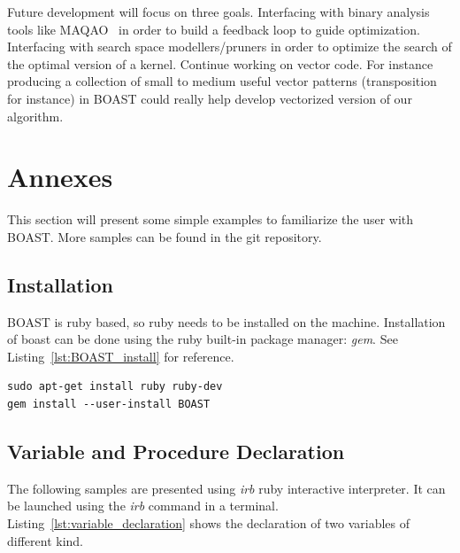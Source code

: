\documentclass[11pt, a4paper, twoside]{montblanc}
\begin{document}
Future development will focus on three goals. Interfacing with binary analysis
tools like MAQAO~\cite{djoudi2005exploring} in order to build a feedback loop to
guide optimization. Interfacing with search space modellers/pruners in order to
optimize the search of the optimal version of a kernel. Continue working on
vector code. For instance producing a collection of small to medium useful
vector patterns (transposition for instance) in BOAST could really help develop
vectorized version of our algorithm.






\section*{Annexes}

This section will present some simple examples to familiarize the user with
BOAST. More samples can be found in the git repository.

\subsection*{Installation}

BOAST is ruby based, so ruby needs to be installed on the machine.
Installation of boast can be done using the ruby built-in package manager:
\textit{gem}. See Listing~\ref{lst:BOAST_install} for reference.

\begin{lstlisting}
sudo apt-get install ruby ruby-dev
gem install --user-install BOAST
\end{lstlisting}

\subsection*{Variable and Procedure Declaration}

The following samples are presented using \textit{irb} ruby interactive
interpreter. It can be launched using the \textit{irb} command in a terminal.
Listing~\ref{lst:variable_declaration} shows the declaration of two variables
of different kind.
\end{document}
